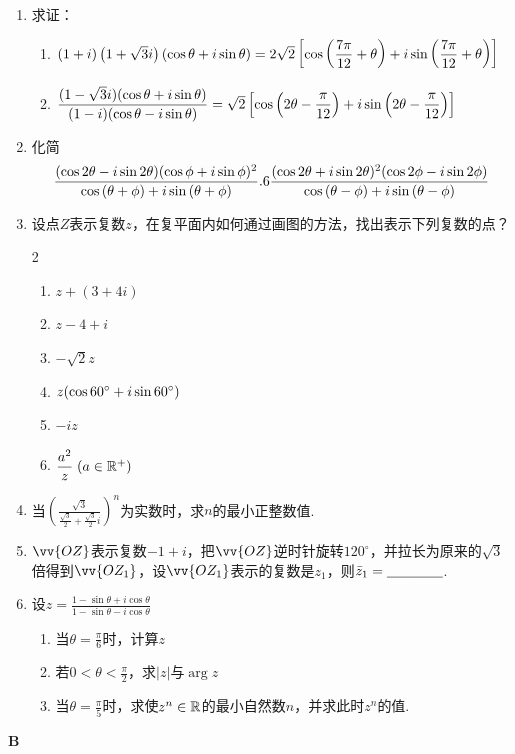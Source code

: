 \begin{enumerate}
\item 求证： 
\begin{enumerate}[(1)]
    \item $(1+i)\left(1+\sqrt{3}i\right)(\cos\theta+i\sin\theta)=2\sqrt{2}\left[\cos\left(\dfrac{7\pi}{12}+\theta\right)+i\sin\left(\dfrac{7\pi}{12}+\theta\right)\right]$
    \item $\dfrac{(1-\sqrt{3}i)(\cos\theta+i\sin\theta)}{(1-i)(\cos\theta-i \sin\theta)}=\sqrt{2}\left[\cos\left(2\theta-\dfrac{\pi}{12}\right)+i\sin\left(2\theta-\dfrac{\pi}{12}\right)\right]$
\end{enumerate}

\item 化简
\[\dfrac{(\cos2\theta-i\sin2\theta)(\cos\phi+i\sin\phi)^2}{\cos\left(\theta+\phi\right)+i\sin\left(\theta+\phi\right)}.6 \dfrac{(\cos2\theta+i\sin2\theta)^2(\cos2\phi-i\sin2\phi)}{\cos\left(\theta-\phi\right)+i\sin\left(\theta-\phi\right)}\]
\item 设点$Z$表示复数$z$，在复平面内如何通过画图的方法，找出表示下列复数的点？
\begin{multicols}{2}
\begin{enumerate}[(1)]
    \item $z+(3+4i)$
    \item $z-4+i$
    \item $-\sqrt{2}z$
    \item $z(\cos60^{\circ}+i\sin60^{\circ})$
    \item $-iz$
    \item $\dfrac{a^2}{z}\; (a\in\mathbb{R}^+)$
\end{enumerate}
\end{multicols}

\item 当$\left(\frac{\sqrt{3}}{\frac{\sqrt{3}}{2}+\frac{\sqrt{3}}{2}i}\right)^n$为实数时，求$n$的最小正整数值.
\item $\vv{OZ}$表示复数$-1+i$，把$\vv{OZ}$逆时针旋转$120^{\circ}$，并拉长为原来的$\sqrt{3}$倍得到$\vv{OZ_1}$，设$\vv{OZ_1}$表示的复数是$z_1$，则$\bar z_1=\underline{\qquad}\underline{\qquad}$.

\item 设$z=\frac{1-\sin\theta+i\cos\theta}{1-\sin\theta-i\cos\theta}$
\begin{enumerate}[(1)]
    \item 当$\theta=\frac{\pi}{6}$时，计算$z$
    \item 若$0<\theta<\frac{\pi}{2}$，求$|z|$与$\arg z$
    \item 当$\theta=\frac{\pi}{5}$时，求使$z^n\in\mathbb{R}$的最小自然数$n$，并求此时$z^n$的值.
\end{enumerate}

\end{enumerate}

\begin{center}
    \bfseries B
\end{center}


